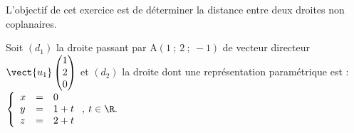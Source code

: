 \medskip

L'objectif de cet exercice est de déterminer la distance entre deux droites non coplanaires.





Soit $(d_1)$ la droite passant par A$(1~;~2~;~-1)$ de vecteur directeur $\vect{u_1}\begin{pmatrix}1\\2\\0\end{pmatrix}$ et $(d_2)$ la droite dont une représentation paramétrique est : 
$\left\{\begin{array}{l c l}
x&=&0\\y &=& 1 + t\\z &=& 2 + t\\
\end{array}\right.,\: t  \in \R.$

\medskip

